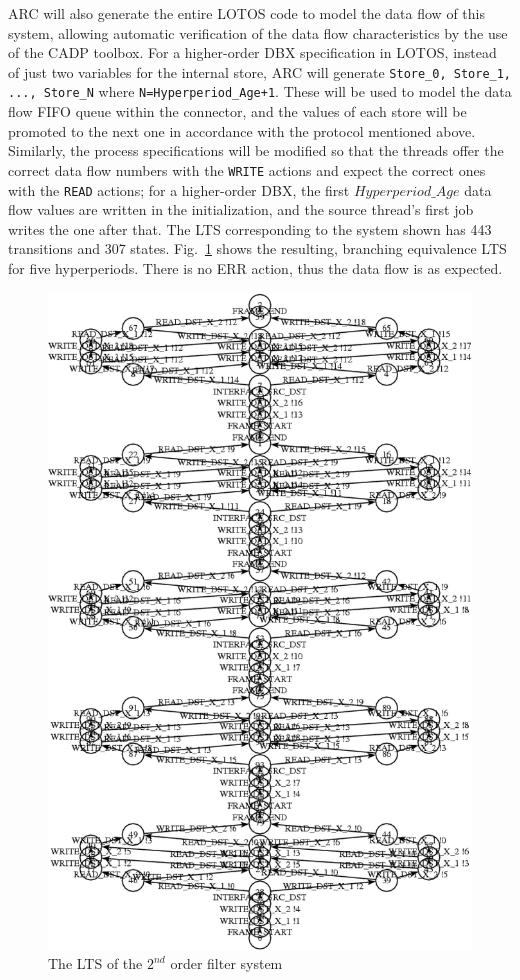 ARC will also generate the entire LOTOS code to model the data flow of
this system, allowing automatic verification of the data flow
characteristics by the use of the CADP toolbox. For a higher-order DBX
specification in LOTOS, instead of just two variables for the internal
store, ARC will generate \texttt{Store\_0, Store\_1, ..., Store\_N}
where \texttt{N=Hyperperiod\_Age+1}. These will be used to model the
data flow FIFO queue within the connector, and the values of each
store will be promoted to the next one in accordance with the protocol
mentioned above. Similarly, the process specifications will be
modified so that the threads offer the correct data flow numbers with
the \texttt{WRITE} actions and expect the correct ones with the
\texttt{READ} actions; for a higher-order DBX, the first
$Hyperperiod\_Age$ data flow values are written in the initialization,
and the source thread's first job writes the one after that. The LTS
corresponding to the system shown has 443 transitions and 307
states. Fig.~\ref{fig:second_order} shows the resulting, branching
equivalence LTS for five hyperperiods. There is no ERR action, thus
the data flow is as expected.

\begin{figure}
\centering
\includegraphics[scale=0.75]{figs/second_order}
\caption{The LTS of the $2^{nd}$ order filter system}
\label{fig:second_order}
\end{figure}

